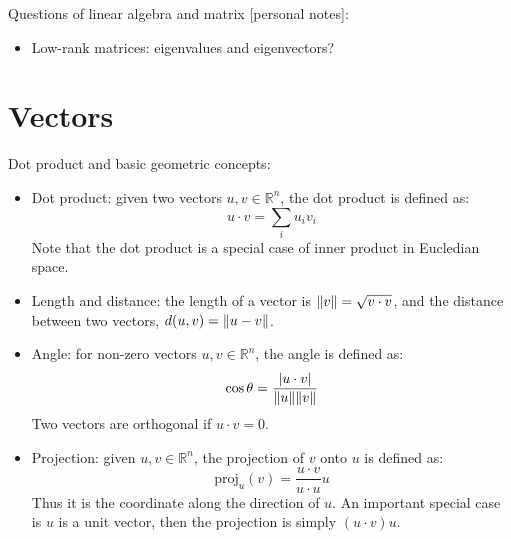 \documentclass{report}
\begin{document}
Questions of linear algebra and matrix [personal notes]: 
\begin{itemize}
	\item Low-rank matrices: eigenvalues and eigenvectors? 
\end{itemize}

\section{Vectors}

Dot product and basic geometric concepts: 
\begin{itemize}
\item Dot product: given two vectors $u,v \in \mathbb{R}^n$, the dot product is defined as:
\begin{equation}
u \cdot v = \sum_i u_i v_i	
\end{equation}
Note that the dot product is a special case of inner product in Eucledian space. 

\item Length and distance: the length of a vector is $\lVert v\rVert = \sqrt{v \cdot v}$, and the distance between two vectors, $d(u,v) = \lVert u - v\rVert$. 

\item Angle: for non-zero vectors $u,v \in \mathbb{R}^n$, the angle is defined as:
\begin{equation}
\cos \theta = \frac{|u \cdot v|}{\lVert u\rVert \lVert v\rVert}	
\end{equation}
Two vectors are orthogonal if $u \cdot v = 0$. 

\item Projection: given $u,v \in \mathbb{R}^n$, the projection of $v$ onto $u$ is defined as: 
\begin{equation}
\text{proj}_u(v) = \frac{u \cdot v}{u \cdot u} u
\end{equation}
Thus it is the coordinate along the direction of $u$. An important special case is $u$ is a unit vector, then the projection is simply $(u \cdot v) u$. 
\end{itemize}
\end{document}
